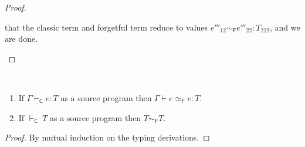 \documentclass[9pt]{extarticle}
\newcommand{\ottnt}[1]{\mathit{#1}}
\begin{document}
{\begin{lemma}
\begin{proof}
{\begin{itemize}
\begin{itemize}
        that the classic term and forgetful term reduce to values
        $ \ottnt{e'''_{{\mathrm{12}}}}   \sim _{  \mathsf{F}  }  \ottnt{e'''_{{\mathrm{22}}}}  :  \ottnt{T_{{\mathrm{222}}}} $, and we are done.
      \end{itemize}
    \end{itemize}
    \fi}
  \end{proof}
\end{lemma}

\begin{lemma}
  \label{lem:forgetfullr}
  ~

  \noindent
  \begin{enumerate}
  \item \label{flr:term} If $ \Gamma   \vdash _{  \mathsf{C}  }  \ottnt{e}  :  \ottnt{T} $ as a source program then
    $ \Gamma   \vdash   \ottnt{e}   \simeq _{  \mathsf{F}  }  \ottnt{e}  :  \ottnt{T} $.
  \item \label{flr:type} If $ \mathord{  \vdash _{  \mathsf{C}  } }~ \ottnt{T} $ as a source program then $ \ottnt{T}   \sim _{  \mathsf{F}  }  \ottnt{T} $.
  \end{enumerate}
\begin{proof}
    By mutual induction on the typing derivations.
    
    {\iffull

}
\end{proof}
\end{lemma}}
\end{document}
